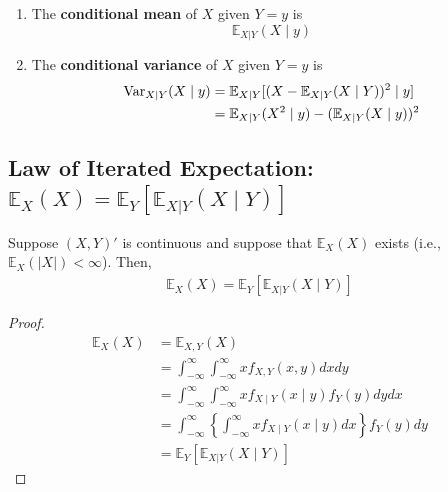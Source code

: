 \documentclass[11pt]{elegantbook}
\begin{document}
\begin{definition}
    \normalfont
    \begin{enumerate}[$\circ$]
        \item The \textbf{conditional mean} of $X$ given $Y=y$ is $$\mathbb{E}_{X|Y}(X\mid y)$$
        \item The \textbf{conditional variance} of $X$ given $Y=y$ is
        \begin{equation}
            \begin{aligned}
                \textnormal{Var}_{X|Y}(X\mid y)&=\mathbb{E}_{X|Y}[(X-\mathbb{E}_{X|Y}(X\mid Y))^2\mid y]\\
                &=\mathbb{E}_{X|Y}(X^2\mid y)-(\mathbb{E}_{X|Y}(X\mid y))^2
            \end{aligned}
            \nonumber
        \end{equation}
    \end{enumerate}
\end{definition}

\subsection{Law of Iterated Expectation: $\mathbb{E}_X(X)=\mathbb{E}_Y[\mathbb{E}_{X|Y}(X\mid Y)]$}
\begin{theorem}
    Suppose $(X,Y)'$ is continuous and suppose that $\mathbb{E}_X(X)$ exists (i.e., $\mathbb{E}_X(|X|)<\infty$). Then,
    \begin{equation}
        \begin{aligned}
            \mathbb{E}_X(X)=\mathbb{E}_Y[\mathbb{E}_{X|Y}(X\mid Y)]
        \end{aligned}
        \nonumber
    \end{equation}
\end{theorem}
\begin{proof}
    \begin{equation}
        \begin{aligned}
            \mathbb{E}_X(X)&=\mathbb{E}_{X,Y}(X)\\
            &=\int_{-\infty}^\infty\int_{-\infty}^\infty x f_{X,Y}(x,y) dx dy\\
            &=\int_{-\infty}^\infty\int_{-\infty}^\infty x f_{X\mid Y}(x\mid y) f_Y(y) dy dx\\
            &=\int_{-\infty}^\infty\left\{\int_{-\infty}^\infty x f_{X\mid Y}(x\mid y)dx\right\} f_Y(y) dy \\
            &=\mathbb{E}_Y[\mathbb{E}_{X|Y}(X\mid Y)]
        \end{aligned}
        \nonumber
    \end{equation}
\end{proof}
\end{document}
